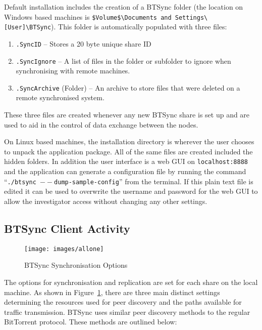 \documentclass[final,5p,times,twocolumn]{elsarticle}
\begin{document}
Default installation includes the creation of a BTSync folder (the location on Windows based machines is \texttt{\$Volume\$\textbackslash Documents and Settings\textbackslash [User]\textbackslash BTSync}). This folder is automatically populated with three files:
\begin{enumerate}
\item \texttt{.SyncID} -- Stores a 20 byte unique share ID
\item \texttt{.SyncIgnore} -- A list of files in the folder or subfolder to ignore when synchronising with remote machines.
\item \texttt{.SyncArchive} (Folder) -- An archive to store files that were deleted on a remote synchronised system.
\end{enumerate}
These three files are created whenever any new BTSync share is set up and are used to aid in the control of data exchange between the nodes.

On Linux based machines, the installation directory is wherever the user chooses to unpack the application package. All of the same files are created included the hidden folders. In addition the user interface is a web GUI on \texttt{localhost:8888} and the application can generate a configuration file by running the command ``\texttt{./btsync $--$dump-sample-config}'' from the terminal. If this plain text file is edited it can be used to overwrite the username and password for the web GUI to allow the investigator access without changing any other settings.

\subsection{BTSync Client Activity}
\label{BTSyncClient}

\begin{figure}[!h]
\centering
\texttt{[image: images/allone]}
\caption{BTSync Synchronisation Options}
\label{fig:syncopts}
\end{figure}

The options for synchronisation and replication are set for each share on the local machine. As shown in Figure~\ref{fig:syncopts}, there are three main distinct settings determining the resources used for peer discovery and the paths available for traffic transmission. BTSync uses similar peer discovery methods to the regular BitTorrent protocol. These methods are outlined below:
\end{document}
